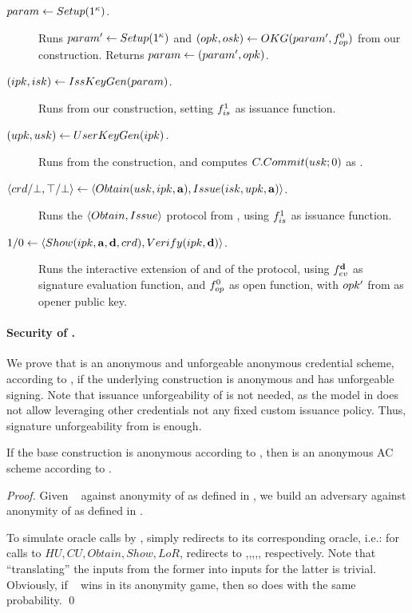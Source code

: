\begin{description}
\item[$param \gets Setup(1^\kappa)$.] Runs $param' \gets Setup(1^\kappa)$
    and $(opk,osk) \gets OKG(param',f_{op}^0)$ from our \CUASGen
    construction. Returns $param \gets (param',opk)$.
\item[$(ipk,isk) \gets IssKeyGen(param)$.] Runs \IKeyGen from our
  \CUASGen construction, setting $f_{is}^1$ as issuance function.
\item[$(upk,usk) \gets UserKeyGen(ipk)$.] Runs \UKeyGen from the
  \CUASGen construction, and computes $C.Commit(usk;0)$ as \upk.
\item[$\langle crd/\bot,\top/\bot \rangle \gets
  \langle Obtain(usk,ipk,\mathbf{a}),Issue(isk,upk,\mathbf{a}) \rangle$.]
  Runs the $\langle Obtain,Issue \rangle$ protocol from \CUASGen, using
  $f_{is}^1$ as issuance function.
\item[$1/0 \gets \langle Show(ipk,\mathbf{a},\mathbf{d},crd),
  Verify(ipk,\mathbf{d}) \rangle$.]
  Runs the interactive extension of \Sign and \Verify of the \CUASGen protocol,
  using $f_{ev}^{\mathbf{d}}$ as signature evaluation function, and $f_{op}^0$ as
  open function, with $opk'$ from \parm as opener public key.
\end{description}

\paragraph{Security of \CUASAC.} %
We prove that \CUASAC is an anonymous and unforgeable anonymous credential
scheme, according to \cite{fhs19}, if the underlying \CUASGen construction
is anonymous and has unforgeable signing. Note that issuance unforgeability
of \CUASGen is not needed, as the model in \cite{fhs19} does not allow
leveraging other credentials not any fixed custom issuance policy. Thus,
signature unforgeability from \UAS is enough.

\begin{theorem}
  If the base \CUASGen construction is anonymous according to
  , then \CUASAC is an anonymous AC scheme
  according to \cite{fhs19}.
\end{theorem}

\begin{proof}
  Given \adv~ against anonymity of \CUASAC as defined in \cite{fhs19}, we build
  an adversary \advB against anonymity of \CUASGen as defined in
  .

  To simulate oracle calls by \adv, \advB simply redirects to its corresponding
  oracle, i.e.: for calls to $HU,CU,Obtain,Show,LoR$, \advB redirects to
  \HUGEN,\CUGEN,\OBTAIN,\SIGN,\CHALb, respectively. Note that ``translating''
  the inputs from the former into inputs for the latter is trivial.
  Obviously, if \adv~ wins in its anonymity game, then so does \advB with the
  same probability.
  \qed
\end{proof}


